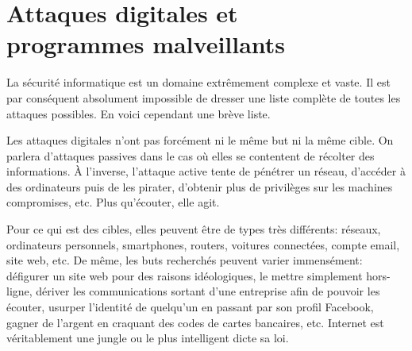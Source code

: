\documentclass[article, french]{yReport}
\begin{document}
	
	\appendices
	\renewcommand{\thesection}{\Alph{section}}
	\section[Types d'attaques informatiques]{Attaques digitales et\\programmes malveillants}
	\label{app:typeVirus}
	La sécurité informatique est un domaine extrêmement complexe et vaste. Il est par conséquent absolument impossible de dresser une liste complète de toutes les attaques possibles. En voici cependant une brève liste.
	
	Les attaques digitales n'ont pas forcément ni le même but ni la même cible. On parlera d'attaques passives dans le cas où elles se contentent de récolter des informations. À l'inverse, l'attaque active tente de pénétrer un réseau, d'accéder à des ordinateurs puis de les pirater, d'obtenir plus de privilèges sur les machines compromises, etc. Plus qu'écouter, elle agit.
	
	Pour ce qui est des cibles, elles peuvent être de types très différents: réseaux, ordinateurs personnels, smartphones, routers, voitures connectées, compte email, site web, etc. De même, les buts recherchés peuvent varier immensément: défigurer un site web pour des raisons idéologiques, le mettre simplement hors-ligne, dériver les communications sortant d'une entreprise afin de pouvoir les écouter, usurper l'identité de quelqu'un en passant par son profil Facebook, gagner de l'argent en craquant des codes de cartes bancaires, etc. Internet est véritablement une jungle ou le plus intelligent dicte sa loi.
	
\end{document}
